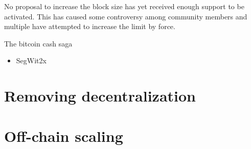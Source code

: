 No proposal to increase the block size has yet received enough support to be activated. This has caused some controversy among community members and multiple have attempted to increase the limit by force.

The bitcoin cash saga

\begin{itemize}
	\item SegWit2x
\end{itemize} 

\section{Removing decentralization}

\section{Off-chain scaling}
